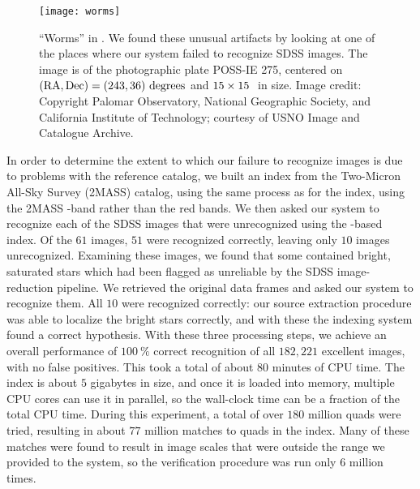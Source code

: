 \begin{figure}[htp]
\begin{center}
\texttt{[image: worms]}
\end{center}
\caption{``Worms'' in \usnob.  We found these unusual artifacts
by looking at one of the places where our system failed to recognize
SDSS images.  The image is of the photographic plate POSS-IE 275,
centered on $(\mathrm{RA},\mathrm{Dec}) = (243, 36)~\mathrm{degrees}$ and $15\times15~$
in size.  Image credit: Copyright Palomar Observatory, National
Geographic Society, and California Institute of Technology; courtesy
of USNO Image and Catalogue Archive.
\label{fig:worms}}
\end{figure}


In order to determine the extent to which our failure to recognize
images is due to problems with the \usnob reference catalog, we built
an index from the Two-Micron All-Sky Survey (2MASS) catalog, using the
same process as for the \usnob index, using the 2MASS
-band rather than the \usnob red bands.  We then asked our
system to recognize each of the SDSS images that were unrecognized
using the \usnob-based index.  Of the $61$ images, $51$ were
recognized correctly, leaving only $10$ images unrecognized.
Examining these images, we found that some contained bright, saturated
stars which had been flagged as unreliable by the SDSS image-reduction
pipeline.  We retrieved the original data frames and asked our system
to recognize them.  All $10$ were recognized correctly: our source
extraction procedure was able to localize the bright stars correctly,
and with these the indexing system found a correct hypothesis.  With
these three processing steps, we achieve an overall performance of
$100~\percent$ correct recognition of all $182,221$ excellent images,
with no false positives.  This took a total of about $80$ minutes of
CPU time.  The index is about $5$ gigabytes in size, and once it is
loaded into memory, multiple CPU cores can use it in parallel, so the
wall-clock time can be a fraction of the total CPU time.  During this
experiment, a total of over $180$ million quads were tried, resulting
in about $77$ million matches to quads in the index.  Many of these
matches were found to result in image scales that were outside the
range we provided to the system, so the verification procedure was run
only $6$ million times.


